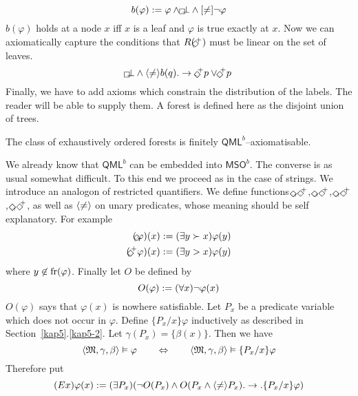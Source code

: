 \begin{equation}
b(\varphi) := \varphi \und \qunten \bot \und [\neq] \nicht \varphi
\end{equation}
$b(\varphi)$ holds at a node $x$  iff
$x$ is a leaf and $\varphi$ is true exactly at $x$. Now we can
axiomatically capture the conditions that
$R(\rechts^+)$ must be linear on the set of leaves.
\begin{equation}
\qunten \bot \und \auf\neq\zu b(q). \pf.
\rechts^+ p \oder \links^+ p
\end{equation}
Finally, we have to add axioms which constrain the distribution of
the labels. The reader will be able to supply them. A 
forest is defined here as the disjoint union of trees.
\begin{prop}
The class of exhaustively ordered forests is fi\-ni\-te\-ly
$\mathsf{QML}^b$--axi\-o\-ma\-ti\-sa\-ble.
\end{prop}
We already know that $\mathsf{QML}^b$ can be embedded into
$\mathsf{MSO}^b$. The converse is as usual somewhat difficult.
To this end we proceed as in the case of strings. We introduce
an analogon of restricted quantifiers. We define
functions $\oben$, $\oben^+$, $\unten$, $\unten^+$,
$\rechts$, $\rechts^+$, $\links$, $\links^+$, as well as
$\langle\neq\rangle$ on unary predicates, whose meaning should
be self explanatory. For example
\begin{subequations}
\begin{align}
(\oben \varphi)(x) & := (\exists y \succ x)\varphi(y) \\
(\oben^+ \varphi)(x) & := (\exists y > x)\varphi(y)
\end{align}
\end{subequations}
where $y \not\in \operatorname{fr}(\varphi)$.
Finally let $O$ be defined by
\begin{equation}
O(\varphi) := (\forall x)\neg \varphi(x)
\end{equation}
$O(\varphi)$ says that $\varphi(x)$ is nowhere satisfiable. Let 
$P_x$ be a  predicate variable which
does not occur in $\varphi$. Define $\{P_x/x\}\varphi$ inductively
as described in Section~\ref{kap5}.\ref{kap5-2}. Let $\gamma(P_x) =
\{\beta(x)\}$. Then we have
\begin{equation}
\langle \mathfrak{M}, \gamma, \beta\rangle \vDash \varphi\qquad
\Leftrightarrow\qquad \langle \mathfrak{M}, \gamma, \beta\rangle \vDash
\{P_x/x\}\varphi 
\end{equation}
Therefore put
\begin{equation}
(E x)\varphi(x) := (\exists P_x)(\neg O(P_x) \wedge
    O(P_x \wedge \langle\neq\rangle P_x).  \rightarrow .\{P_x/x\}\varphi)
\end{equation}
